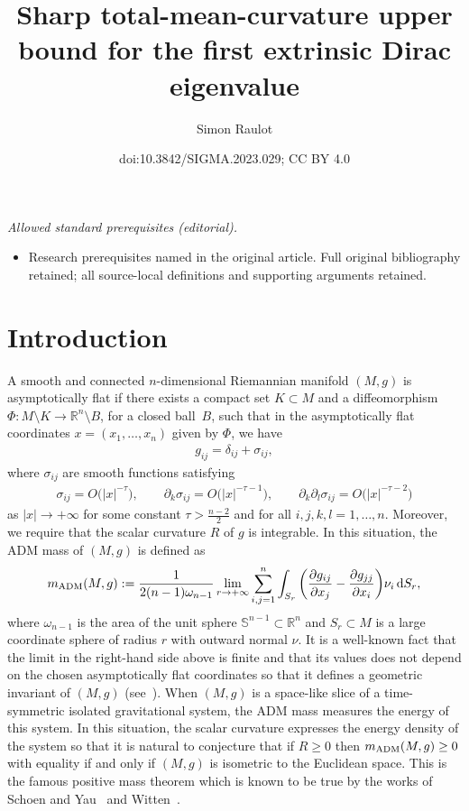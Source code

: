 \documentclass[10pt,a4paper]{amsart}
\title{Sharp total-mean-curvature upper bound for the first extrinsic Dirac eigenvalue}
\author{Simon Raulot}
\date{doi:10.3842/SIGMA.2023.029; CC BY 4.0}
\numberwithin{equation}{section}
\begin{document}
\maketitle
\noindent\textit{Allowed standard prerequisites (editorial).}\begin{itemize}
\item Research prerequisites named in the original article. Full original bibliography retained; all source-local definitions and supporting arguments retained.
\end{itemize}\medskip
\section{Introduction}

A smooth and connected $n$-dimensional Riemannian manifold $(M,g)$ is asymptotically flat if there exists a compact set $K\subset M$ and a diffeomorphism $\Phi\colon M\setminus K\rightarrow\mathbb{R}^n\setminus B$, for a closed ball~$B$, such that in the asymptotically flat coordinates $x=(x_1,\dots,x_n)$ given by $\Phi$, we have
\begin{gather*}%
g_{ij}=\delta_{ij}+\sigma_{ij},
\end{gather*}
where $\sigma_{ij}$ are smooth functions satisfying
\begin{gather*}
\sigma_{ij}=O\big(|x|^{-\tau}\big),\qquad
\partial_k\sigma_{ij}=O\big(|x|^{-\tau-1}\big),\qquad
\partial_k\partial_l\sigma_{ij}=O\big(|x|^{-\tau-2}\big)
\end{gather*}
as $|x|\rightarrow+\infty$ for some constant $\tau>\frac{n-2}{2}$ and for all $i,j,k,l=1,\dots,n$. Moreover, we require that the scalar curvature $R$ of $g$ is integrable. In this situation, the ADM mass of $(M,g)$ is defined as
\begin{gather*}
m_{\rm ADM}(M,g):=\frac{1}{2(n-1)\omega_{n-1}}\lim_{r\rightarrow+\infty}
\sum_{i,j=1}^n\int_{S_r}\bigg(\frac{\partial g_{ij}}{\partial x_j}-\frac{\partial g_{jj}}{\partial x_i}\bigg)\nu_i\,{\rm d}S_r,
\end{gather*}
where $\omega_{n-1}$ is the area of the unit sphere $\mathbb{S}^{n-1}\subset\mathbb{R}^n$ and $S_r\subset M$ is a large coordinate sphere of radius $r$ with outward normal $\nu$. It is a well-known fact that the limit in the right-hand side above is finite and that its values does not depend on the chosen asymptotically flat coordinates so that it defines a geometric invariant of $(M,g)$ (see~\cite{Bartnik1,Chrusciel1}). When $(M,g)$ is a space-like slice of a time-symmetric isolated gravitational system, the ADM mass measures the energy of this system. In this situation, the scalar curvature expresses the energy density of the system so that it is natural to conjecture that if $R\geq 0$ then $m_{\rm ADM}(M,g)\geq 0$ with equality if and only if $(M,g)$ is isometric to the Euclidean space. This is the famous positive mass theorem which is known to be true by the works of Schoen and Yau~\cite{SchoenYau5,SchoenYau3} and Witten~\cite{Witten1}.
\end{document}
